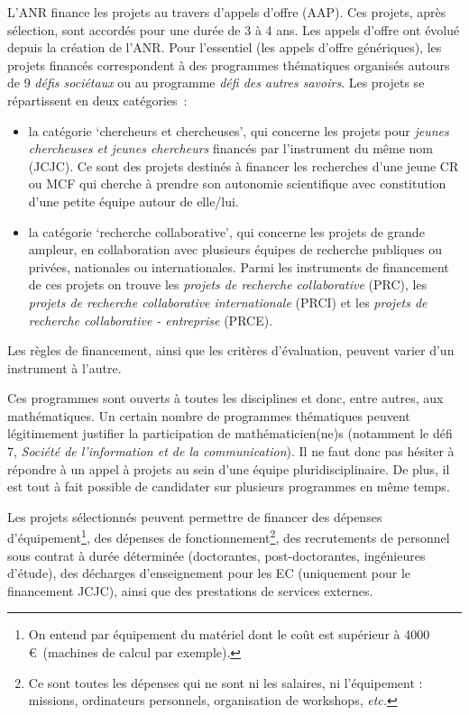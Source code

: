 L'ANR finance les projets au travers d'appels d'offre (AAP). Ces projets, apr\`es s\'election, sont accord\'es pour une dur\'ee de 3 {\`a} 4 ans. Les appels d'offre ont \'evolu\'e depuis la cr\'eation de l'ANR. Pour l'essentiel (les appels d'offre g\'en\'eriques), les projets financ\'es correspondent \`a des programmes th\'ematiques organis\'es autours de 9 {\em d\'efis soci\'etaux} ou au programme {\em d\'efi des autres savoirs}. Les projets se r\'epartissent en deux cat\'egories~:
\begin{itemize}
\item la cat\'egorie `chercheurs et chercheuses', qui concerne les projets pour {\em jeunes chercheuses et jeunes chercheurs} financ\'es par l'instrument du m\^eme nom (JCJC). Ce sont des projets destin\'es \`a financer les recherches d'un\mp e jeune CR ou MCF qui cherche {\`a} prendre son autonomie scientifique avec constitution d'une petite {\'e}quipe autour de elle/lui.
\item la cat\'egorie `recherche collaborative', qui concerne les projets de grande ampleur, en collaboration avec plusieurs \'equipes de recherche publiques ou priv\'ees, nationales ou internationales. Parmi les instruments de financement de ces projets on trouve les {\em projets de recherche collaborative} (PRC), les {\em projets de recherche collaborative internationale} (PRCI) et les {\em projets de recherche collaborative - entreprise} (PRCE).
\end{itemize}

Les r\`egles de financement, ainsi que les crit\`eres
d'\'evaluation, peuvent varier d'un instrument \`a l'autre. %

Ces programmes sont ouverts \`a toutes les disciplines et donc, entre autres,
aux math\'ematiques. Un certain nombre de programmes th\'ematiques
peuvent l\'egitimement justifier la participation de math\'ematicien(ne)s (notamment le d\'efi 7, {\em Soci\'et\'e de l'information et de la communication}).
Il ne faut donc pas h\'esiter \`a r\'epondre
\`a un appel \` a projets au sein d'une \'equipe pluridisciplinaire. De plus, il est tout \`a
fait possible de candidater sur plusieurs programmes en m\^eme temps.

Les projets s\'electionn\'es peuvent permettre de financer des d\'epenses d'\'equipement\footnote{On entend par \'equipement du mat\'eriel dont le co\^ut est sup\'erieur \`a 4000\,\euro~(machines de calcul par exemple).}, des d\'epenses de fonctionnement\footnote{Ce sont toutes les d\'epenses qui ne sont ni les salaires, ni l'\'equipement : missions, ordinateurs personnels, organisation de workshops, {\em etc.}}, des recrutements de personnel sous contrat \`a dur\'ee d\'etermin\'ee (doctorant\mp e\mp s, post-doctorant\mp e\mp s, ing\'enieur\mp e\mp s
d'\'etude), des d\'echarges d'enseignement pour les EC (uniquement pour le financement JCJC), ainsi que des prestations de services externes.

